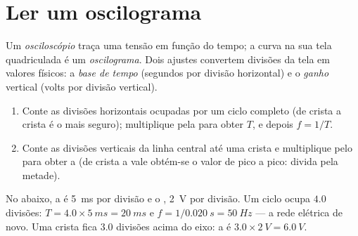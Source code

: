 \section{Ler um oscilograma}

\begin{definition}[Osciloscópio]\label{def:g10:signals-and-waves:oscilloscope}
Um \emph{osciloscópio} traça uma tensão em função do
tempo; a curva na sua tela quadriculada é um
\emph{oscilograma}. Dois ajustes convertem divisões da
tela em valores físicos: a \emph{base de tempo}
(segundos por divisão horizontal) e o \emph{ganho} vertical
(volts por divisão vertical).
\end{definition}

\begin{method}\label{met:g10:signals-and-waves:oscillogram}
\begin{enumerate}
  \item Conte as divisões horizontais ocupadas por um ciclo completo (de
        crista a crista é o mais seguro); multiplique pela 
        para obter $T$, e depois $f = 1/T$.
  \item Conte as divisões verticais da linha central até uma crista e
        multiplique pelo  para obter a  (de crista a vale
        obtém-se o valor de pico a pico: divida pela metade).
\end{enumerate}
\end{method}

\begin{example}\label{ex:g10:signals-and-waves:reading}
No  abaixo, a  é \qty{5}{ms} por divisão e o
, \qty{2}{V} por divisão. Um ciclo ocupa $4.0$ divisões:
$T = 4.0 \times \qty{5}{ms} = \qty{20}{ms}$ e
$f = 1/\qty{0.020}{s} = \qty{50}{Hz}$ --- a rede elétrica de novo. Uma
crista fica $3.0$ divisões acima do eixo: a  é
$3.0 \times \qty{2}{V} = \qty{6.0}{V}$.
\end{example}

